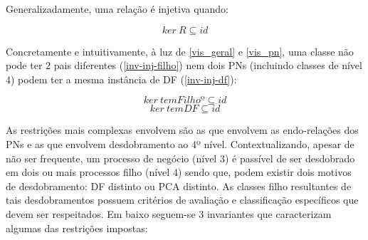 \documentclass[tikz,runningheads,a4paper]{llncs}
\begin{document}
Generalizadamente, uma relação é injetiva quando:

\begin{equation}
\label{injetivity}
    ker\ R \subseteq id
\end{equation}

Concretamente e intuitivamente, à luz de \ref{vis_geral} e \ref{vis_pn}, uma classe não pode ter 2 pais diferentes (\ref{inv-inj-filho}) nem dois PNs (incluindo classes de nível 4) podem ter a mesma instância de DF (\ref{inv-inj-df}):

\begin{equation}
    \label{inv-inj-filho}
    ker\ temFilhoº \subseteq id
\end{equation}
\begin{equation}
    \label{inv-inj-df}
    ker\ temDF \subseteq id
\end{equation}

As restrições mais complexas envolvem são as que envolvem as endo-relações dos PNs e as que envolvem desdobramento ao 4º nível. Contextualizando, apesar de não ser frequente, um processo de negócio (nível 3) é passível de ser desdobrado em dois ou mais processos filho (nível 4) sendo que, podem existir dois motivos de desdobramento: DF distinto ou PCA distinto. As classes filho resultantes de tais desdobramentos possuem critérios de avaliação e classificação específicos que devem ser respeitados. Em baixo seguem-se 3 invariantes que caracterizam algumas das restrições impostas:
\end{document}
